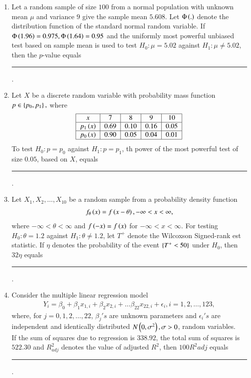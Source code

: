 \documentclass[journal]{IEEEtran}
\begin{document}
\begin{enumerate}
	\item Let a random sample of size $100$ from a normal population with unknown mean $\mu$ and variance $9$ give the sample mean $5.608$. Let $\Phi\left(.\right)$ denote the distribution function of the standard normal random variable. If $\Phi\left(1.96\right)=0.975,\Phi\left(1.64\right)=0.95$ and the uniformly most powerful unbiased test based on sample mean is used to test $H_0:\mu =5.02$ against $H_1:\mu \neq 5.02$, then the $p$-value equals \rule{1cm}{0.15mm} .
    \item Let $X$ be a discrete random variable with probability mass function $p\in \left\{p_0,p_1\right\},$ where
    \begin{align*}
       \begin{tabular}{|c|c|c|c|c|}
    \hline
    $x$ & 7 & 8 & 9 & 10  \\
    \hline
    $p_1\brak{x}$ & 0.69 & 0.10 & 0.16 & 0.05 \\
    \hline
    $p_0\brak{x}$ & 0.90 & 0.05 & 0.04 & 0.01 \\
    \hline
\end{tabular}
\end{align*}
         To test $H_0:p=p_0$ against $H_1:p=p_1$, th power of the most powerful test of size $0.05$, based on $X$, equals \rule{1cm}{0.15mm} .
    \item Let $X_1,X_2,\ldots,X_{10}$ be a random sample from a probability density function 
    \begin{align*}
        f_\theta \left(x\right) =f\left(x-\theta\right), -\infty<x<\infty,
    \end{align*}
    where $-\infty<\theta<\infty$ and $f\left(-x\right)=f\left(x\right)$ for $-\infty <x<\infty$. For testing $H_0:\theta=1.2$ against $H_1:\theta \neq1.2$, let $T^+$ denote the Wilcoxson Signed-rank est statistic. If $\eta$ denotes the probability of the event $\left\{T^+<50\right\}$ under $H_0$, then $32\eta$ equals \rule{1cm}{0.15mm} .
    \item Consider the multiple linear regression model
         \begin{align*}
             Y_i=\beta_0+\beta_1x_{1,i}+\beta_2x_{2,i}+\ldots \beta_{22}x_{22,i}+\epsilon_i, i=1,2,\ldots,123,
         \end{align*}
         where, for $j=0,1,2,\ldots,22$, $\beta_j's$ are unknown parameters and $\epsilon_i's$ are independent and identically distributed $N\left(0,\sigma^2\right),\sigma>0$, random variables.\\
         If the sum of squares due to regression is $338.92$, the total sum of squares is $522.30$ and $R_{adj}^2$ denotes the value of adjusted $R^2$, then $100R^2{adj}$ equals \rule{1cm}{0.15mm} .
	
\end{enumerate}	
\end{document}
